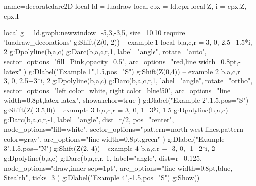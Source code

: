 \begin{luadraw}{name=decoratedarc2D}
local ld = luadraw
local cpx = ld.cpx
local Z, i = cpx.Z, cpx.I

local g = ld.graph:new{window={-5,3,-3,5}, size={10,10}}
require 'luadraw_decorations'
g:Shift(Z(0,-2)) -- example 1
local b,a,c,r = 3, 0, 2.5+1.5*i, 2
g:Dpolyline({b,a,c})
g:Darc(b,a,c,r,1, {
    label="angle", rotate="auto", 
    sector_options="fill=Pink,opacity=0.5", 
    arc_options="red,line width=0.8pt,-latex"  })
g:Dlabel("Example 1",1.5,{pos="S"})
g:Shift(Z(0,4))  -- example 2     
b,a,c,r = 3, 0, 2.5+3*i, 2    
g:Dpolyline({b,a,c})
g:Darc(b,a,c,r,1, {
    label="angle", rotate="ortho", 
    sector_options="left color=white, right color=blue!50", 
    arc_options="line width=0.8pt,latex-latex",
    showanchor=true  })
g:Dlabel("Example 2",1.5,{pos="S"})
g:Shift(Z(-3.5,0))  -- example 3     
b,a,c,r = 3, 0, 1+3*i, 1.5    
g:Dpolyline({b,a,c})
g:Darc(b,a,c,r,-1, {
    label="angle", dist=r/2, pos="center",
    node_options="fill=white",
    sector_options="pattern=north west lines,pattern color=gray", 
    arc_options="line width=0.8pt,green"   })
g:Dlabel("Example 3",1.5,{pos="N"})    
g:Shift(Z(2,-4)) -- example 4
b,a,c,r = -3, 0, -1+2*i, 2    
g:Dpolyline({b,a,c})
g:Darc(b,a,c,r,-1, {
    label="angle", dist=r+0.125, 
    node_options="draw,inner sep=1pt",
    arc_options="line width=0.8pt,blue,-Stealth",
    ticks=3  })
g:Dlabel("Example 4",-1.5,{pos="S"})
g:Show()
\end{luadraw}
